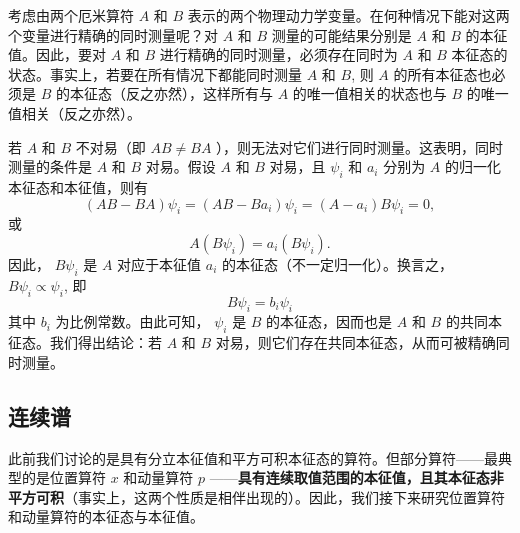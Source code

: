 考虑由两个厄米算符 $ A $ 和 $ B $ 表示的两个物理动力学变量。在何种情况下能对这两个变量进行精确的同时测量呢？对 $ A $ 和 $ B $ 测量的可能结果分别是 $ A $ 和 $ B $ 的本征值。因此，要对 $ A $ 和 $ B $ 进行精确的同时测量，必须存在同时为 $ A $ 和 $ B $ 本征态的状态。事实上，若要在所有情况下都能同时测量 $ A $ 和 $ B $, 则 $ A $ 的所有本征态也必须是 $ B $ 的本征态（反之亦然），这样所有与 $ A $ 的唯一值相关的状态也与 $ B $ 的唯一值相关（反之亦然）。

若 $ A $ 和 $ B $ 不对易（即 $ AB \neq BA $ ），则无法对它们进行同时测量。这表明，同时测量的条件是 $ A $ 和 $ B $ 对易。假设 $ A $ 和 $ B $ 对易，且 $ \psi_{i} $ 和 $ a_{i} $ 分别为 $ A $ 的归一化本征态和本征值，则有
\begin{equation}
	(AB - BA) \psi_i = (AB - B a_i) \psi_i = (A - a_i) B \psi_i = 0,
\end{equation}
或
\begin{equation}
	A (B \psi_i) = a_i (B \psi_i). 
\end{equation}
因此， $ B \psi_{i} $ 是 $ A $ 对应于本征值 $ a_{i} $ 的本征态（不一定归一化）。换言之， $ B \psi_{i} \propto \psi_{i} $, 即
\begin{equation}
	B \psi_i = b_i \psi_i
\end{equation}
其中 $ b_{i} $ 为比例常数。由此可知， $ \psi_{i} $ 是 $ B $ 的本征态，因而也是 $ A $ 和 $ B $ 的共同本征态。我们得出结论：若 $ A $ 和 $ B $ 对易，则它们存在共同本征态，从而可被精确同时测量。

\subsection{连续谱}
此前我们讨论的是具有分立本征值和平方可积本征态的算符。但部分算符——最典型的是位置算符 $ x $ 和动量算符 $ p $ ——\textbf{具有连续取值范围的本征值，且其本征态非平方可积}（事实上，这两个性质是相伴出现的）。因此，我们接下来研究位置算符和动量算符的本征态与本征值。

